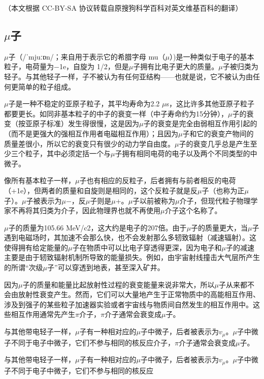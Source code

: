 

（本文根据 CC-BY-SA 协议转载自原搜狗科学百科对英文维基百科的翻译）
\subsection{$\mu$子}

$\mu$子（/ˈmjuːɒn/；来自用于表示它的希腊字母 mu（$\mu$）)是一种类似于电子的基本粒子，电荷量为−1e，自旋为 1/2，但是$\mu$子拥有比电子更大的质量。$\mu$子被归类为轻子。与其他轻子一样，子不被认为有任何亚结构——也就是说，它不被认为由任何更简单的粒子组成。

$\mu$子是一种不稳定的亚原子粒子，其平均寿命为2.2 $\mu$s，这比许多其他亚原子粒子都要更长。如同非基本粒子的中子的衰变一样（中子寿命约为15分钟），$\mu$子的衰变（按亚原子标准）发生得很慢，这是因为$\mu$子的衰变是完全由弱相互作用引起的（而不是更强大的强相互作用者电磁相互作用）；且因为$\mu$子和它的衰变产物间的质量差很小，所以它的衰变只有很少的动力学自由度。$\mu$子的衰变几乎总是产生至少三个粒子，其中必须定括一个与$\mu$子拥有相同电荷的电子以及两个不同类型的中微子。

像所有基本粒子一样，$\mu$子也有相应的反粒子，后者拥有与前者相反的电荷（+1e），但两者的质量和自旋则是相同的，这个反粒子就是反$\mu$子（也称为正$\mu$子）。$\mu$子被表示为$\mu$−，反$\mu$子则是$\mu$+。$\mu$子以前被称为$\mu$介子，但现代粒子物理学家不再将其归类为介子，因此物理界也就不再使用$\mu$介子这个名称了。

$\mu$子的质量为105.66 MeV/c2，这大约是电子的207倍。由于$\mu$子的质量更大，当$\mu$子遇到电磁场时，其加速不会那么快，也不会发射那么多轫致辐射（减速辐射）。这使得拥有给定能量的$\mu$子在物质中可以比电子穿透得更深，因为电子和$\mu$子的减速主要是由于轫致辐射机制所导致的能量损失。例如，由宇宙射线撞击大气层所产生的所谓“次级$\mu$子”可以穿透到地表，甚至深入矿井。

因为$\mu$子的质量和能量比起放射性过程的衰变能量来说非常大，所以$\mu$子从来都不会由放射性衰变产生。然而，它们可以大量地产生于正常物质中的高能相互作用、涉及到强子的某些粒子加速器实验或者宇宙线与物质间自然发生的相互作用中。这些相互作用通常先产生$\pi$介子，$\pi$介子通常会衰变成$\mu$子。

与其他带电轻子一样，$\mu$子有一种相对应的$\mu$子中微子，后者被表示为$v_\mu$。$\mu$子中微子不同于电子中微子，它们不参与相同的核反应介子，$\pi$介子通常会衰变成$\mu$子。

与其他带电轻子一样，$\mu$子有一种相对应的$\mu$子中微子，后者被表示为$v_\mu$。$\mu$子中微子不同于电子中微子，它们不参与相同的核反应

